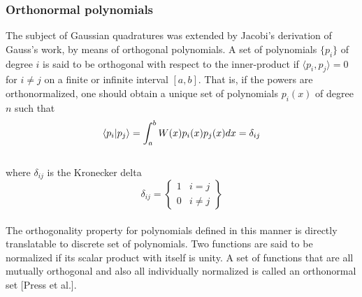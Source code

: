 \documentclass[%
reprint,nofootinbib,
amsmath,amssymb,
aps,
]{revtex4-1}
\begin{document}
\subsubsection*{Orthonormal polynomials} \noindent 
The subject of Gaussian quadratures was extended by Jacobi's derivation of Gauss's work, by means of orthogonal polynomials. A set of polynomials $\{p_i\}$ of degree $i$ is said to be orthogonal with respect to the inner-product if $\langle p_i, p_j \rangle = 0$ for $i\not = j$ on a finite or infinite interval $[a,b]$. That is, if the powers are orthonormalized, one should obtain a unique set of polynomials $p_i(x)$ of degree $n$ such that \vspace{2mm} \\
\begin{equation*}
	\braket{p_i}{p_j} = 
	\int_{a}^{b} W(x)p_i(x)p_j(x)dx = \delta_{ij} 
\end{equation*}\vspace{2mm} \\
where $\delta_{ij}$ is the Kronecker delta\vspace{1mm} \\
\begin{equation*}
	\delta_{ij} = \left\{
	\begin{array}{ll}
	1 & i = j\\
	0 & i \not =j 
	\end{array} \right\}
\end{equation*}\vspace{1mm} \\
The orthogonality property for polynomials defined in this manner is directly translatable to discrete set of polynomials. Two functions are said to be normalized if its scalar product with itself is unity. A set of functions that are all mutually orthogonal and also all  individually normalized is called an orthonormal set [Press et al.].
\end{document}
